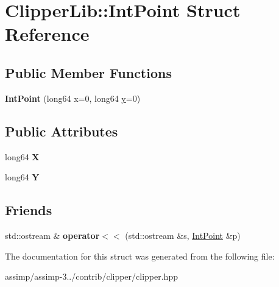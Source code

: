 \hypertarget{struct_clipper_lib_1_1_int_point}{\section{Clipper\+Lib\+:\+:Int\+Point Struct Reference}
\label{struct_clipper_lib_1_1_int_point}
}
\subsection*{Public Member Functions}
\begin{DoxyCompactItemize}
\item 
\hypertarget{struct_clipper_lib_1_1_int_point_a455b8d5c7f6d4c8e5adebcac8fa11e71}{{\bfseries Int\+Point} (long64 x=0, long64 \hyperlink{_ice_utils_8h_aa7ffaed69623192258fb8679569ff9ba}{y}=0)}\label{struct_clipper_lib_1_1_int_point_a455b8d5c7f6d4c8e5adebcac8fa11e71}

\end{DoxyCompactItemize}
\subsection*{Public Attributes}
\begin{DoxyCompactItemize}
\item 
\hypertarget{struct_clipper_lib_1_1_int_point_af47546895f6b0403abf4701cb00bd6fa}{long64 {\bfseries X}}\label{struct_clipper_lib_1_1_int_point_af47546895f6b0403abf4701cb00bd6fa}

\item 
\hypertarget{struct_clipper_lib_1_1_int_point_a24a7d31ef4e1a5d8a70e7e29f5429011}{long64 {\bfseries Y}}\label{struct_clipper_lib_1_1_int_point_a24a7d31ef4e1a5d8a70e7e29f5429011}

\end{DoxyCompactItemize}
\subsection*{Friends}
\begin{DoxyCompactItemize}
\item 
\hypertarget{struct_clipper_lib_1_1_int_point_a9d7a086edc8217df9f23c9c1635e2fd9}{std\+::ostream \& {\bfseries operator$<$$<$} (std\+::ostream \&s, \hyperlink{struct_clipper_lib_1_1_int_point}{Int\+Point} \&p)}\label{struct_clipper_lib_1_1_int_point_a9d7a086edc8217df9f23c9c1635e2fd9}

\end{DoxyCompactItemize}


The documentation for this struct was generated from the following file\+:\begin{DoxyCompactItemize}
\item 
assimp/assimp-\/3../contrib/clipper/clipper.\+hpp\end{DoxyCompactItemize}

